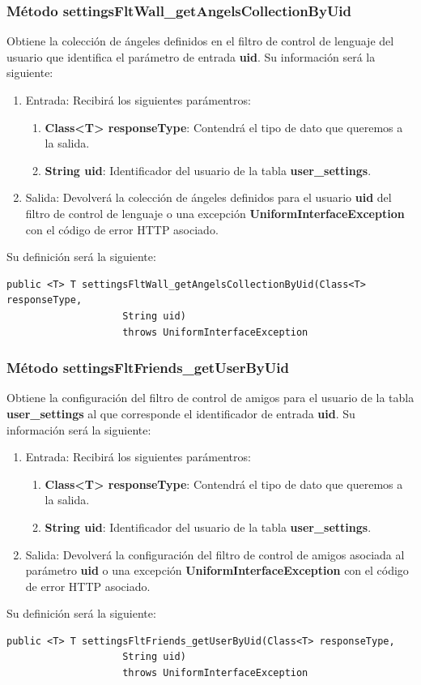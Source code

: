 \subsubsection{Método settingsFltWall\_getAngelsCollectionByUid}
Obtiene la colección de ángeles definidos en el filtro de control de lenguaje del usuario que identifica el parámetro de entrada \textbf{uid}. Su información será la siguiente:
\begin{enumerate}
\item Entrada: Recibirá los siguientes parámentros:
\begin{enumerate}
\item \textbf{Class<T> responseType}: Contendrá el tipo de dato que queremos a la salida. 
\item \textbf{String uid}: Identificador del usuario de la tabla \textbf{user\_settings}.
\end{enumerate}
\item Salida: Devolverá la colección de ángeles definidos para el usuario \textbf{uid} del filtro de control de lenguaje o una excepción \textbf{UniformInterfaceException} con el código de error HTTP asociado.
\end{enumerate}
\bigskip
\par
Su definición será la siguiente:
\begin{verbatim}public <T> T settingsFltWall_getAngelsCollectionByUid(Class<T> responseType, 
					String uid) 
					throws UniformInterfaceException \end{verbatim}



\subsubsection{Método settingsFltFriends\_getUserByUid}
Obtiene la configuración del filtro de control de amigos para el usuario de la tabla \textbf{user\_settings} al que corresponde el identificador de entrada \textbf{uid}. Su información será la siguiente:
\begin{enumerate}
\item Entrada: Recibirá los siguientes parámentros:
\begin{enumerate}
\item \textbf{Class<T> responseType}: Contendrá el tipo de dato que queremos a la salida. 
\item \textbf{String uid}: Identificador del usuario de la tabla \textbf{user\_settings}.
\end{enumerate}
\item Salida: Devolverá la configuración del filtro de control de amigos asociada al parámetro \textbf{uid} o una excepción \textbf{UniformInterfaceException} con el código de error HTTP asociado.
\end{enumerate}
\bigskip
\par
Su definición será la siguiente:
\begin{verbatim}public <T> T settingsFltFriends_getUserByUid(Class<T> responseType, 
					String uid) 
					throws UniformInterfaceException\end{verbatim}

